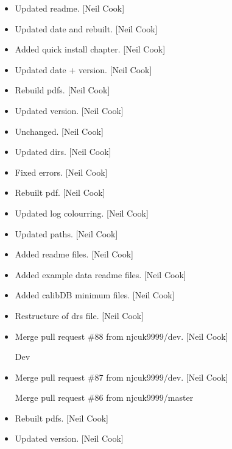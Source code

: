 \documentclass[a4paper,10pt,english]{report}
\begin{document}
\begin{itemize}
\item {} 
Updated readme. {[}Neil Cook{]}

\item {} 
Updated date and rebuilt. {[}Neil Cook{]}

\item {} 
Added quick install chapter. {[}Neil Cook{]}

\item {} 
Updated date + version. {[}Neil Cook{]}

\item {} 
Rebuild pdfs. {[}Neil Cook{]}

\item {} 
Updated version. {[}Neil Cook{]}

\item {} 
Unchanged. {[}Neil Cook{]}

\item {} 
Updated dirs. {[}Neil Cook{]}

\item {} 
Fixed errors. {[}Neil Cook{]}

\item {} 
Rebuilt pdf. {[}Neil Cook{]}

\item {} 
Updated log colourring. {[}Neil Cook{]}

\item {} 
Updated paths. {[}Neil Cook{]}

\item {} 
Added readme files. {[}Neil Cook{]}

\item {} 
Added example data readme files. {[}Neil Cook{]}

\item {} 
Added calibDB minimum files. {[}Neil Cook{]}

\item {} 
Restructure of drs file. {[}Neil Cook{]}

\item {} 
Merge pull request \#88 from njcuk9999/dev. {[}Neil Cook{]}

Dev

\item {} 
Merge pull request \#87 from njcuk9999/dev. {[}Neil Cook{]}

Merge pull request \#86 from njcuk9999/master

\item {} 
Rebuilt pdfs. {[}Neil Cook{]}

\item {} 
Updated version. {[}Neil Cook{]}


\end{itemize}
\end{document}
